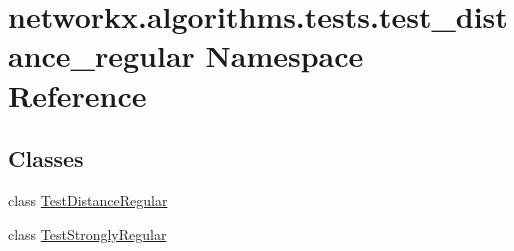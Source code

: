 \hypertarget{namespacenetworkx_1_1algorithms_1_1tests_1_1test__distance__regular}{}\section{networkx.\+algorithms.\+tests.\+test\+\_\+distance\+\_\+regular Namespace Reference}
\label{namespacenetworkx_1_1algorithms_1_1tests_1_1test__distance__regular}
\subsection*{Classes}
\begin{DoxyCompactItemize}
\item 
class \hyperlink{classnetworkx_1_1algorithms_1_1tests_1_1test__distance__regular_1_1TestDistanceRegular}{Test\+Distance\+Regular}
\item 
class \hyperlink{classnetworkx_1_1algorithms_1_1tests_1_1test__distance__regular_1_1TestStronglyRegular}{Test\+Strongly\+Regular}
\end{DoxyCompactItemize}
